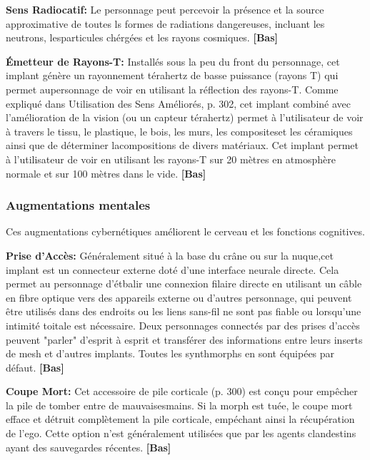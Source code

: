 {{\textbf{Sens Radiocatif:} Le personnage peut percevoir la présence et la source approximative de toutes ls formes de radiations dangereuses, incluant les neutrons, lesparticules chérgées et les rayons cosmiques. \textbf{[Bas]} 

\textbf{Émetteur de Rayons-T:} Installés sous la peu du front du personnage, cet implant génère un rayonnement térahertz de basse puissance (rayons T) qui permet aupersonnage de voir en utilisant la réflection des rayons-T. Comme expliqué dans Utilisation des Sens Améliorés, p. 302, cet implant combiné avec l'amélioration de la vision (ou un capteur térahertz) permet à l'utilisateur de voir à travers le tissu, le plastique, le bois, les murs, les compositeset les céramiques ainsi que de déterminer lacompositions de divers matériaux. Cet implant permet à l'utilisateur de voir en utilisant les rayons-T sur 20 mètres en atmosphère normale et sur 100 mètres dans le vide. \textbf{[Bas]} 

\subsubsection{Augmentations mentales} 

Ces augmentations cybernétiques améliorent le cerveau et les fonctions cognitives. 

\textbf{Prise d'Accès:} Généralement situé à la base du crâne ou sur la nuque,cet implant est un connecteur externe doté d'une interface neurale directe. Cela permet au personnage d'étbalir une connexion filaire directe en utilisant un câble en fibre optique vers des appareils externe ou d'autres personnage, qui peuvent être utilisés dans des endroits ou les liens sans-fil ne sont pas fiable ou lorsqu'une intimité toitale est nécessaire. Deux personnages connectés par des prises d'accès peuvent "parler" d'esprit à esprit et transférer des informations entre leurs inserts de mesh et d'autres implants. Toutes les synthmorphs en sont équipées par défaut. \textbf{[Bas]} 

\textbf{Coupe Mort:} Cet accessoire de pile corticale (p. 300) est conçu pour empêcher la pile de tomber entre de mauvaisesmains. Si la morph est tuée, le coupe mort efface et détruit complètement la pile corticale, empéchant ainsi la récupération de l'ego. Cette option n'est généralement utilisées que par les agents clandestins ayant des sauvegardes récentes. \textbf{[Bas]} 

}}
